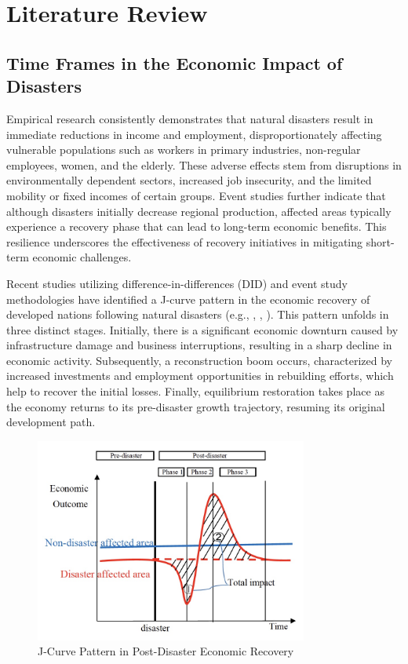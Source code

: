 \documentclass[a4paper,12pt]{article}
\begin{document}
\section{Literature Review}
\subsection{Time Frames in the Economic Impact of Disasters}


Empirical research consistently demonstrates that natural disasters result in immediate reductions in income and employment, disproportionately affecting vulnerable populations such as workers in primary industries, non-regular employees, women, and the elderly. These adverse effects stem from disruptions in environmentally dependent sectors, increased job insecurity, and the limited mobility or fixed incomes of certain groups. Event studies further indicate that although disasters initially decrease regional production, affected areas typically experience a recovery phase that can lead to long-term economic benefits. This resilience underscores the effectiveness of recovery initiatives in mitigating short-term economic challenges.

Recent studies utilizing difference-in-differences (DID) and event study methodologies have identified a J-curve pattern in the economic recovery of developed nations following natural disasters (e.g., \citet{Deryugina2018TheReturns}, \citet{Kahraman2023AEarthquake}, \citet{Porcelli2019TheItaly}). This pattern unfolds in three distinct stages. Initially, there is a significant economic downturn caused by infrastructure damage and business interruptions, resulting in a sharp decline in economic activity. Subsequently, a reconstruction boom occurs, characterized by increased investments and employment opportunities in rebuilding efforts, which help to recover the initial losses. Finally, equilibrium restoration takes place as the economy returns to its pre-disaster growth trajectory, resuming its original development path.


\begin{figure}[h!]
    \centering
    \includegraphics[width=0.8\textwidth]{conceptual_image.jpeg}  %
    \caption{J-Curve Pattern in Post-Disaster Economic Recovery}
    \label{fig:conceptual_image}
\end{figure}
\end{document}
